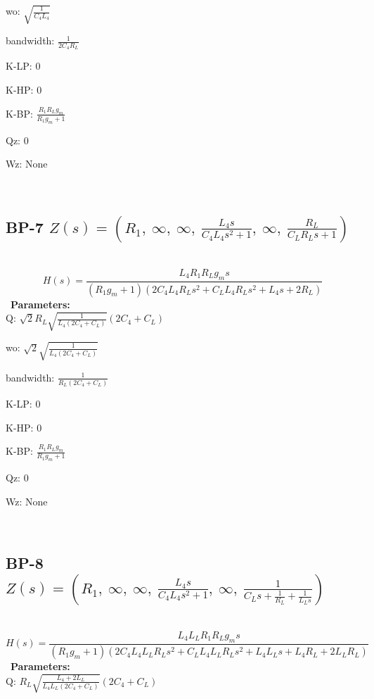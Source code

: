\documentclass{article}
\begin{document}
wo: $\sqrt{\frac{1}{C_{4} L_{4}}}$\ 

bandwidth: $\frac{1}{2 C_{4} R_{L}}$\ 

K-LP: $0$\ 

K-HP: $0$\ 

K-BP: $\frac{R_{1} R_{L} g_{m}}{R_{1} g_{m} + 1}$\ 

Qz: $0$\ 

Wz: $\text{None}$\ 

\ 

\subsection{BP-7 $Z(s) = \left( R_{1}, \  \infty, \  \infty, \  \frac{L_{4} s}{C_{4} L_{4} s^{2} + 1}, \  \infty, \  \frac{R_{L}}{C_{L} R_{L} s + 1}\right)$ } \ 
\textbf{\[H(s) = \frac{L_{4} R_{1} R_{L} g_{m} s}{\left(R_{1} g_{m} + 1\right) \left(2 C_{4} L_{4} R_{L} s^{2} + C_{L} L_{4} R_{L} s^{2} + L_{4} s + 2 R_{L}\right)}\] } \ 
\textbf{Parameters:}\\ 

Q: $\sqrt{2} R_{L} \sqrt{\frac{1}{L_{4} \left(2 C_{4} + C_{L}\right)}} \left(2 C_{4} + C_{L}\right)$\ 

wo: $\sqrt{2} \sqrt{\frac{1}{L_{4} \left(2 C_{4} + C_{L}\right)}}$\ 

bandwidth: $\frac{1}{R_{L} \left(2 C_{4} + C_{L}\right)}$\ 

K-LP: $0$\ 

K-HP: $0$\ 

K-BP: $\frac{R_{1} R_{L} g_{m}}{R_{1} g_{m} + 1}$\ 

Qz: $0$\ 

Wz: $\text{None}$\ 

\ 

\subsection{BP-8 $Z(s) = \left( R_{1}, \  \infty, \  \infty, \  \frac{L_{4} s}{C_{4} L_{4} s^{2} + 1}, \  \infty, \  \frac{1}{C_{L} s + \frac{1}{R_{L}} + \frac{1}{L_{L} s}}\right)$ } \ 
\textbf{\[H(s) = \frac{L_{4} L_{L} R_{1} R_{L} g_{m} s}{\left(R_{1} g_{m} + 1\right) \left(2 C_{4} L_{4} L_{L} R_{L} s^{2} + C_{L} L_{4} L_{L} R_{L} s^{2} + L_{4} L_{L} s + L_{4} R_{L} + 2 L_{L} R_{L}\right)}\] } \ 
\textbf{Parameters:}\\ 

Q: $R_{L} \sqrt{\frac{L_{4} + 2 L_{L}}{L_{4} L_{L} \left(2 C_{4} + C_{L}\right)}} \left(2 C_{4} + C_{L}\right)$\ 
\end{document}
